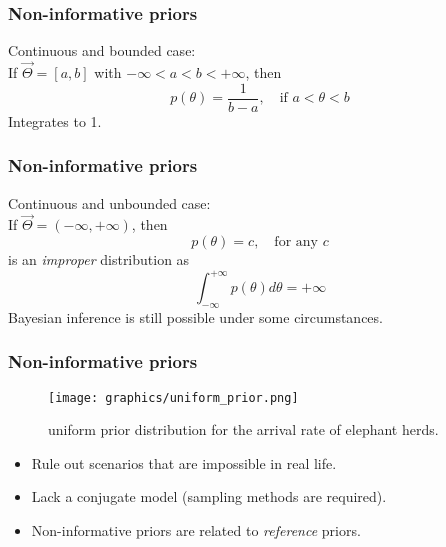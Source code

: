 \documentclass{beamer}
\newcommand{\1}{\ensuremath{\mathbf{1}}}
\begin{document}
\begin{frame}\frametitle{Non-informative priors}
	Continuous and bounded case:\\[1.5ex]
	If $\vec\Theta = [a,b]$ with $-\infty < a < b < +\infty$, then
	\begin{equation}
		p(\theta) = \frac{1}{b-a}, \quad \text{if $a < \theta < b$} 	
	\end{equation}
	Integrates to 1.
\end{frame}
%
%
%
\begin{frame}\frametitle{Non-informative priors}
	Continuous and unbounded case:\\[1.5ex]
	If $\vec\Theta = (-\infty, +\infty)$, then
	\begin{equation}
		p(\theta) = c, \quad \text{for any $c$} 	
	\end{equation}
	is an \emph{improper} distribution as
	\begin{equation}
		\int_{-\infty}^{+\infty} p(\theta) d\theta = +\infty
	\end{equation}
	Bayesian inference is still possible under some circumstances.
\end{frame}
%
%
%
\begin{frame}\frametitle{Non-informative priors}
	\begin{figure}
	\begin{center}
		\texttt{[image: graphics/uniform\_prior.png]}
	\end{center}
	\caption{uniform prior distribution for the arrival rate of elephant herds.}
	\end{figure}
	\begin{itemize}
		\item Rule out scenarios that are impossible in real life.
		\item Lack a conjugate model (sampling methods are required).
		\item Non-informative priors are related to \emph{reference} priors.
	\end{itemize}
\end{frame}
%
%
%
\end{document}
